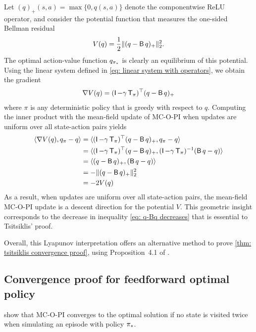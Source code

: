 \begin{remark}
Let $(q)_+ (s,a) = \max \{ 0, q(s,a) \}$ denote the componentwise ReLU operator,
and consider the potential function that measures the one-sided Bellman residual
\begin{align}
    V(q) = \frac{1}{2} \|(q-\operatorname{\mathsf{B}} q)_+\|_2^2 .
\end{align}
The optimal action-value function $q_{{\pi}_*}$ is clearly an equilibrium of this potential.
Using the linear system defined in \eqref{eq: linear system with operators}, we obtain the gradient
\begin{align}
    \nabla V (q) = (\operatorname{\mathsf{I}} - \gamma \operatorname{\mathsf{T}}_\pi )^\top (q-\operatorname{\mathsf{B}} q)_+
\end{align}
where $\pi$ is any deterministic policy that is greedy with respect to $q$.
Computing the inner product with the mean-field update of MC-O-PI when updates are uniform over all state-action pairs yields
\begin{align*}
    \langle \nabla V(q) , q_\pi - q \rangle
    &= \langle (\operatorname{\mathsf{I}} - \gamma \operatorname{\mathsf{T}}_\pi )^\top (q-\operatorname{\mathsf{B}} q)_+ , q_\pi - q \rangle
    \\
    &= \langle (\operatorname{\mathsf{I}} - \gamma \operatorname{\mathsf{T}}_\pi )^\top (q-\operatorname{\mathsf{B}} q)_+ , (\operatorname{\mathsf{I}} - \gamma \operatorname{\mathsf{T}}_\pi )^{-1} (\operatorname{\mathsf{B}} q - q) \rangle
    \\
    &= \langle (q-\operatorname{\mathsf{B}} q)_+ , (\operatorname{\mathsf{B}} q - q) \rangle
    \\
    &= - \|(q - \operatorname{\mathsf{B}} q)_+\|_2^2
    \\
    &= - 2 V(q)
\end{align*}
As a result, when updates are uniform over all state-action pairs, the mean-field MC-O-PI update is a descent direction for the potential $V$.
This geometric insight corresponds to the decrease in inequality \eqref{eq: q-Bq decreases} that is essential to Tsitsiklis' proof.

Overall, this Lyapunov interpretation offers an alternative method to prove \autoref{thm: tsitsiklis convergence proof}, using Proposition~4.1 of \citep{Bertsekas1996Neuro-DynamicProgramming}.
\end{remark}


\subsection{Convergence proof for feedforward optimal policy}

\citet{Wang2022OnLearning} show that MC-O-PI converges to the optimal solution if no state is visited twice when simulating an episode with policy ${\pi}_*$.

